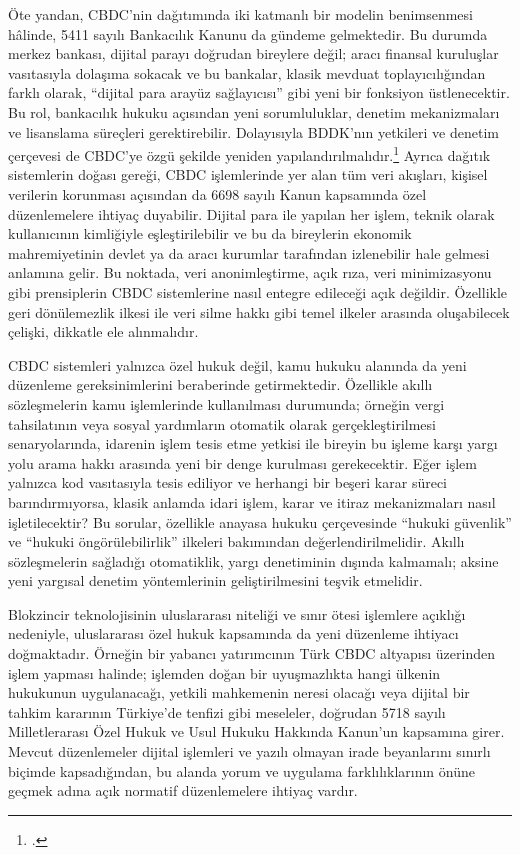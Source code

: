 \documentclass[a4paper,12pt]{article}
\begin{document}
Öte yandan, CBDC’nin dağıtımında iki katmanlı bir modelin benimsenmesi hâlinde, 5411 sayılı Bankacılık Kanunu da gündeme gelmektedir. Bu durumda merkez bankası, dijital parayı doğrudan bireylere değil; aracı finansal kuruluşlar vasıtasıyla dolaşıma sokacak ve bu bankalar, klasik mevduat toplayıcılığından farklı olarak, “dijital para arayüz sağlayıcısı” gibi yeni bir fonksiyon üstlenecektir. Bu rol, bankacılık hukuku açısından yeni sorumluluklar, denetim mekanizmaları ve lisanslama süreçleri gerektirebilir. Dolayısıyla BDDK’nın yetkileri ve denetim çerçevesi de CBDC’ye özgü şekilde yeniden yapılandırılmalıdır.\footcite{emmer2023cbdc} Ayrıca dağıtık sistemlerin doğası gereği, CBDC işlemlerinde yer alan tüm veri akışları, kişisel verilerin korunması açısından da 6698 sayılı Kanun kapsamında özel düzenlemelere ihtiyaç duyabilir. Dijital para ile yapılan her işlem, teknik olarak kullanıcının kimliğiyle eşleştirilebilir ve bu da bireylerin ekonomik mahremiyetinin devlet ya da aracı kurumlar tarafından izlenebilir hale gelmesi anlamına gelir. Bu noktada, veri anonimleştirme, açık rıza, veri minimizasyonu gibi prensiplerin CBDC sistemlerine nasıl entegre edileceği açık değildir. Özellikle geri dönülemezlik ilkesi ile veri silme hakkı gibi temel ilkeler arasında oluşabilecek çelişki, dikkatle ele alınmalıdır.

CBDC sistemleri yalnızca özel hukuk değil, kamu hukuku alanında da yeni düzenleme gereksinimlerini beraberinde getirmektedir. Özellikle akıllı sözleşmelerin kamu işlemlerinde kullanılması durumunda; örneğin vergi tahsilatının veya sosyal yardımların otomatik olarak gerçekleştirilmesi senaryolarında, idarenin işlem tesis etme yetkisi ile bireyin bu işleme karşı yargı yolu arama hakkı arasında yeni bir denge kurulması gerekecektir. Eğer işlem yalnızca kod vasıtasıyla tesis ediliyor ve herhangi bir beşeri karar süreci barındırmıyorsa, klasik anlamda idari işlem, karar ve itiraz mekanizmaları nasıl işletilecektir? Bu sorular, özellikle anayasa hukuku çerçevesinde “hukuki güvenlik” ve “hukuki öngörülebilirlik” ilkeleri bakımından değerlendirilmelidir. Akıllı sözleşmelerin sağladığı otomatiklik, yargı denetiminin dışında kalmamalı; aksine yeni yargısal denetim yöntemlerinin geliştirilmesini teşvik etmelidir.

Blokzincir teknolojisinin uluslararası niteliği ve sınır ötesi işlemlere açıklığı nedeniyle, uluslararası özel hukuk kapsamında da yeni düzenleme ihtiyacı doğmaktadır. Örneğin bir yabancı yatırımcının Türk CBDC altyapısı üzerinden işlem yapması halinde; işlemden doğan bir uyuşmazlıkta hangi ülkenin hukukunun uygulanacağı, yetkili mahkemenin neresi olacağı veya dijital bir tahkim kararının Türkiye'de tenfizi gibi meseleler, doğrudan 5718 sayılı Milletlerarası Özel Hukuk ve Usul Hukuku Hakkında Kanun’un kapsamına girer. Mevcut düzenlemeler dijital işlemleri ve yazılı olmayan irade beyanlarını sınırlı biçimde kapsadığından, bu alanda yorum ve uygulama farklılıklarının önüne geçmek adına açık normatif düzenlemelere ihtiyaç vardır.
\end{document}
